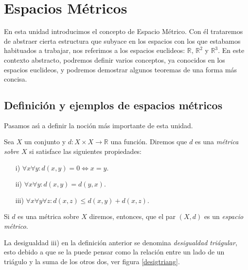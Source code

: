 
\chapter{Espacios M\'etricos}
En esta unidad introducimos el concepto de Espacio M\'etrico. Con
\'el trataremos de abstraer cierta estructura que subyace en los
espacios con los que estabamos habituados a trabajar, nos
referimos a los espacios euclideos: $\mathbb{R}$, $\mathbb{R}^2$ y
$\mathbb{R}^3$. En este contexto abstracto, podremos definir
varios conceptos, ya conocidos en los espacios euclideos, y
podremos demostrar algunos teoremas de una forma m\'as concisa.

\section{Definici\'on y ejemplos de espacios m\'etricos}Pasamos as\'{\i} a definir la noci\'on m\'as importante de
esta unidad.

\begin{definicion} Sea $X$ un conjunto y $d:X\times X\rightarrow
\mathbb{R}$ una funci\'on. Diremos que $d$ es una \emph{m\'etrica
sobre $X$} si satisface las siguientes propiedades:
	  \begin{itemize}
		   \item[i)]$\forall x \forall y: d(x,y)=0\Leftrightarrow x=y$.
		   \item[ii)] $\forall x \forall y : d(x,y)=d(y,x)$.
		   \item[iii)]$\forall x \forall y \forall z: d(x,z)\leq
				d(x,y)+d(x,z)$.
	  \end{itemize}
Si $d$ es una m\'etrica sobre $X$ diremos, entonces, que el par
$(X,d)$ es un \emph{espacio m\'etrico}.
\end{definicion}

La desigualdad iii) en la definici\'on anterior se denomina
\emph{desigualdad tri\'agular}, esto debido a que se la puede
pensar como la relaci\'on entre un lado de un tri\'agulo y la suma
de los otros dos, ver figura  \vref{desigtriang}.


